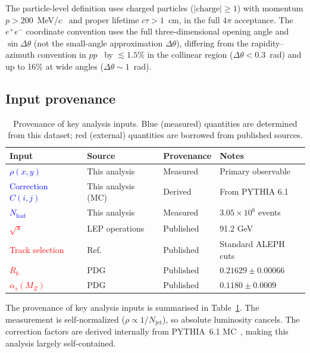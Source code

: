 \documentclass[11pt,a4paper]{article}
\newcommand{\measured}[1]{\textcolor{blue}{#1}}
\newcommand{\external}[1]{\textcolor{red}{#1}}
\begin{document}
The particle-level definition uses charged particles ($|\text{charge}|
\ge 1$) with momentum $p > 200$~MeV/$c$~\cite{ALEPH:1998hhr,ALEPH:1998vtv}
and proper lifetime $c\tau > 1$~cm, in the full $4\pi$ acceptance.
The $e^+e^-$ coordinate convention uses the full three-dimensional
opening angle and $\sin\Delta\theta$ (not the small-angle approximation
$\Delta\theta$), differing from the rapidity--azimuth convention in
$pp$~\cite{Dreyer:2018nbf} by $\lesssim\!1.5\%$ in the collinear
region ($\Delta\theta < 0.3$~rad) and up to 16\% at wide angles
($\Delta\theta \sim 1$~rad).

\subsection{Input provenance}
\label{sec:provenance}

\begin{table}[htbp]
\centering
\caption{Provenance of key analysis inputs.  Blue (measured) quantities
  are determined from this dataset; red (external) quantities are borrowed
  from published sources.}
\label{tbl:provenance}
\begin{tabular}{llll}
\toprule
Input & Source & Provenance & Notes \\
\midrule
\measured{$\rho(x,y)$} & This analysis & Measured & Primary observable \\
\measured{Correction $C(i,j)$} & This analysis (MC) & Derived & From PYTHIA 6.1 \\
\measured{$N_\text{had}$} & This analysis & Measured & $3.05 \times 10^6$ events \\
\external{$\sqrt{s}$} & LEP operations & Published & 91.2 GeV \\
\external{Track selection} & Ref.~\cite{ALEPH:1998hhr,ALEPH:1998vtv} & Published & Standard ALEPH cuts \\
\external{$R_b$} & PDG~\cite{ParticleDataGroup:2024cfk} & Published & $0.21629 \pm 0.00066$ \\
\external{$\alpha_s(M_Z)$} & PDG~\cite{ParticleDataGroup:2024cfk} & Published & $0.1180 \pm 0.0009$ \\
\bottomrule
\end{tabular}
\end{table}

The provenance of key analysis inputs is summarised in
Table~\ref{tbl:provenance}.
The measurement is self-normalized ($\rho \propto 1/N_\text{jet}$),
so absolute luminosity cancels.  The correction factors are
derived internally from PYTHIA~6.1 MC~\cite{Sjostrand:2000wi},
making this analysis largely self-contained.
\end{document}
